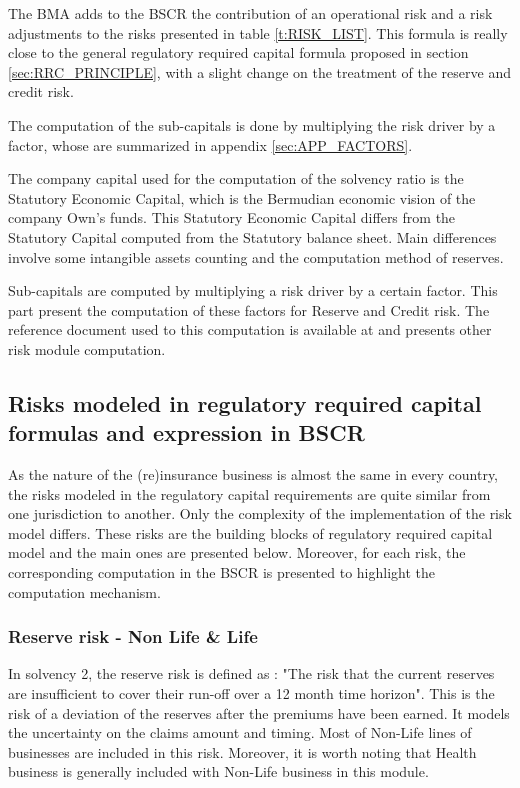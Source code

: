 The BMA adds to the BSCR the contribution of an operational risk and a risk adjustments to the risks presented in table \ref{t:RISK_LIST}. This formula is really close to the general regulatory required capital formula proposed in section \ref{sec:RRC_PRINCIPLE}, with a slight change on the treatment of the reserve and credit risk.

The computation of the sub-capitals is done by multiplying the risk driver by a factor, whose are summarized in appendix \ref{sec:APP_FACTORS}.

The company capital used for the computation of the solvency ratio is the Statutory Economic Capital, which is the Bermudian economic vision of the company Own's funds. This Statutory Economic Capital differs from the Statutory Capital computed from the Statutory balance sheet. Main differences involve some intangible assets counting and the computation method of reserves.

Sub-capitals are computed by multiplying a risk driver by a certain factor. This part present the computation of these factors for Reserve and Credit risk. The reference document used to this computation is available at \cite{BMAAuthority} and presents other risk module computation.




\subsection{Risks modeled in regulatory required capital formulas and expression in BSCR}

As the nature of the (re)insurance business is almost the same in every country, the risks modeled in the regulatory capital requirements are quite similar from one jurisdiction to  another. Only the complexity of the implementation of the risk model differs. These risks are the building blocks of regulatory required capital model and the main ones are presented below. Moreover, for each risk, the corresponding computation in the BSCR is presented to highlight the computation mechanism.


\subsubsection{Reserve risk - Non Life \& Life}

In solvency 2, the reserve risk is defined as : "The risk that the current reserves are insufficient to cover their run-off over a 12 month time horizon". This is the risk of a deviation of the reserves after the premiums have been earned. It models the uncertainty on the claims amount and timing. Most of Non-Life lines of businesses are included in this risk. Moreover, it is worth noting that Health business is generally included with Non-Life business in this module. 

